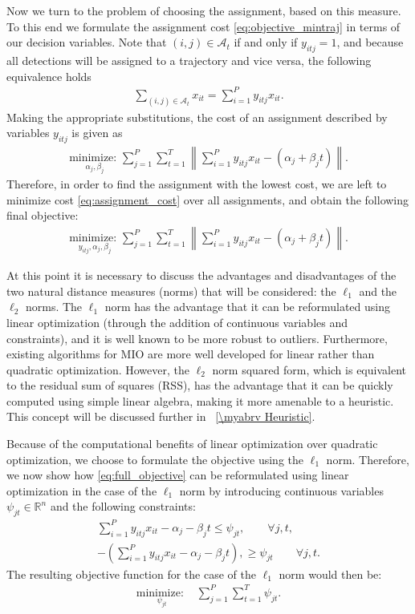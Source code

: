 Now we turn to the problem of choosing the assignment, based on this measure. To this end we formulate the assignment cost \eqref{eq:objective_mintraj} in terms of our decision variables. Note that $(i,j)\in\mathcal{A}_t$ if and only if $y_{itj}=1$, and because all detections will be assigned to a trajectory and vice versa, the following equivalence holds
\begin{align}
\sum_{(i,j)\in \mathcal{A}_{t}} x_{it} = \sum_{i=1}^{P}y_{itj}x_{it}.
\end{align}
Making the appropriate substitutions, the cost of an assignment described by variables $y_{itj}$ is given as
\begin{align}\label{eq:assignment_cost}
 \underset{\alpha_{j}, \beta_{j}}{\text{minimize: }} \sum_{j=1}^{P} \sum_{t=1}^{T}  \left \| \sum_{i=1}^{P}y_{itj}x_{it} - (\alpha_{j} + \beta_{j}t)\right \|.
\end{align}
Therefore, in order to find the assignment with the lowest cost, we are left to minimize cost \eqref{eq:assignment_cost} over all assignments, and obtain the following final objective: 
\begin{align}\label{eq:full_objective}
 \underset{y_{itj}, \alpha_{j}, \beta_{j}}{\text{minimize: }}\sum_{j=1}^{P} \sum_{t=1}^{T}  \left \| \sum_{i=1}^{P}y_{itj}x_{it} - (\alpha_{j} + \beta_{j}t) \right \|.
\end{align}

At this point it is necessary to discuss the advantages and disadvantages of the two natural distance measures (norms) that will be considered: the $\ell_1$ and the $\ell_2$ norms. The $\ell_1$ norm has the advantage that it can be reformulated using linear optimization (through the addition of continuous variables and constraints), and it is well known to be more robust to outliers. Furthermore, existing algorithms for MIO are more well developed for linear rather than quadratic optimization. However, the $\ell_2$ norm squared form, which is equivalent to the residual sum of squares (RSS), has the advantage that it can be quickly computed using simple linear algebra, making it more amenable to a heuristic. This concept will be discussed further in \mysection~\ref{\myabrv Heuristic}.

Because of the computational benefits of linear optimization over quadratic optimization, we choose to formulate the objective using the $\ell_1$ norm. Therefore, we now show how \eqref{eq:full_objective} can be reformulated using linear optimization in the case of the $\ell_1$ norm by introducing continuous variables $\psi_{jt} \in \mathbb{R}^n$ and the following constraints:
\begin{align}
\sum_{i=1}^{P}y_{itj}x_{it} - \alpha_{j} - \beta_{j}t \leq \psi_{jt}, \qquad \forall j,t,\\
-\left(\sum_{i=1}^{P}y_{itj}x_{it} - \alpha_{j} - \beta_{j}t\right), \geq \psi_{jt} \qquad \forall j,t.
\end{align}
The resulting objective function for the case of the $\ell_1$ norm would then be:
\begin{align}
\underset{\psi_{jt}}{\text{minimize: }} & \sum_{j=1}^{P} \sum_{t=1}^{T} \psi_{jt}.
\end{align}


